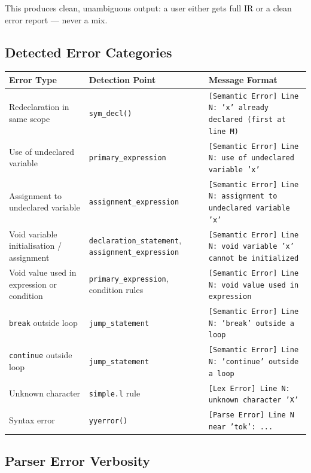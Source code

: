 \documentclass[11pt]{article}
\begin{document}
This produces clean, unambiguous output: a user either gets full IR or a clean error report --- never a mix.

\subsection{Detected Error Categories}

\begin{center}
\renewcommand{\arraystretch}{1.3}
\begin{tabular}{@{}p{5cm}p{4cm}p{5cm}@{}}
\toprule
\textbf{Error Type} & \textbf{Detection Point} & \textbf{Message Format} \\
\midrule
Redeclaration in same scope & \texttt{sym\_decl()} & \texttt{[Semantic Error] Line N: 'x' already declared (first at line M)} \\
Use of undeclared variable & \texttt{primary\_expression} & \texttt{[Semantic Error] Line N: use of undeclared variable 'x'} \\
Assignment to undeclared variable & \texttt{assignment\_expression} & \texttt{[Semantic Error] Line N: assignment to undeclared variable 'x'} \\
Void variable initialisation / assignment & \texttt{declaration\_statement}, \texttt{assignment\_expression} & \texttt{[Semantic Error] Line N: void variable 'x' cannot be initialized} \\
Void value used in expression or condition & \texttt{primary\_expression}, condition rules & \texttt{[Semantic Error] Line N: void value used in expression} \\
\texttt{break} outside loop & \texttt{jump\_statement} & \texttt{[Semantic Error] Line N: 'break' outside a loop} \\
\texttt{continue} outside loop & \texttt{jump\_statement} & \texttt{[Semantic Error] Line N: 'continue' outside a loop} \\
Unknown character & \texttt{simple.l} rule & \texttt{[Lex Error] Line N: unknown character 'X'} \\
Syntax error & \texttt{yyerror()} & \texttt{[Parse Error] Line N near 'tok': ...} \\
\bottomrule
\end{tabular}
\end{center}

\subsection{Parser Error Verbosity}
\end{document}
